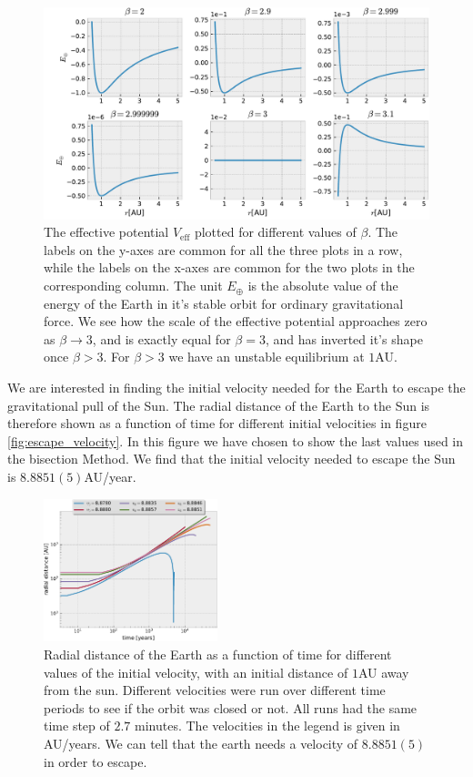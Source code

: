 \documentclass[%
 reprint,
nofootinbib,
aps,
]{revtex4-1}
\begin{document}
\begin{figure}
\centering
\hspace{-1.5cm}
\includegraphics[scale=0.8]{../figures/changing_beta.pdf}
\caption{The effective potential $V_{\mathrm{eff}}$ plotted for different values of $\beta$. The labels on the y-axes are common for all the three plots in a row, while the labels on the x-axes are common for the two plots in the corresponding column. The unit $E_\oplus$ is the absolute value of the energy of the Earth in it's stable orbit for ordinary gravitational force. We see how the scale of the effective potential approaches zero as $\beta\rightarrow 3$, and is exactly equal for $\beta=3$, and has inverted it's shape once $\beta >3$. For $\beta>3$ we have an unstable equilibrium at $1$AU.}
\label{fig: change_beta}
\end{figure}

We are interested in finding the initial velocity needed for the Earth to escape the gravitational pull of the Sun. The radial distance of the Earth to the Sun is therefore shown as a function of time for different initial velocities in figure \vref{fig:escape_velocity}. In this figure we have chosen to show the last values used in the bisection Method. We find that the initial velocity needed to escape the Sun is $8.8851(5)$AU/year.

\begin{figure}
  \centering
  \includegraphics[width=0.45\textwidth]{../figures/escape_velocity.pdf}
  \caption{Radial distance of the Earth as a function of time for different values of the initial velocity, with an initial distance of $1$AU away from the sun. Different velocities were run over different time periods to see if the orbit was closed or not. All runs had the same time step of $2.7$ minutes. The velocities in the legend is given in AU/years. We can tell that the earth needs a velocity of $8.8851(5)$ in order to escape.}
  \label{fig:escape_velocity}
\end{figure}
\end{document}
